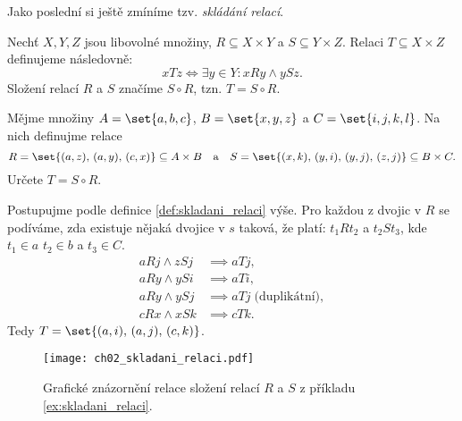 Jako poslední si ještě zmíníme tzv. \emph{skládání relací}.
\begin{definition}\label{def:skladani_relaci}
    Nechť $X,Y,Z$ jsou libovolné množiny, $R\subseteq X\times Y$ a $S\subseteq Y\times Z$. Relaci $T\subseteq X\times Z$ definujeme následovně:
    \begin{equation*}
        xTz \iff \exists y\in Y : xRy \land ySz.
    \end{equation*}
    Složení relací $R$ a $S$ značíme $S\circ R$, tzn. $T=S\circ R$.
\end{definition}
\begin{example}\label{ex:skladani_relaci}
    Mějme množiny $A=\set{a,b,c}$, $B=\set{x,y,z}$ a $C=\set{i,j,k,l}$. Na nich definujme relace
    \begin{equation*}
        R=\set{(a,z),\,(a,y),\,(c,x)}\subseteq A\times B\quad\text{a}\quad S=\set{(x,k),\,(y,i),\,(y,j),\,(z,j)}\subseteq B\times C.
    \end{equation*}
    Určete $T=S\circ R$.
\end{example}
\begin{solution}
    Postupujme podle definice \ref{def:skladani_relaci} výše. Pro každou z dvojic v $R$ se podíváme, zda existuje nějaká dvojice v $s$ taková, že platí: $t_1Rt_2$ a $t_2St_3$, kde $t_1\in a$ $t_2\in b$ a $t_3\in C$.
    \begin{align*}
        aRj \land zSj &\implies aTj,\\
        aRy \land ySi &\implies aTi,\\
        aRy \land ySj &\implies aTj\;\text{(duplikátní)},\\
        cRx \land xSk &\implies cTk.
    \end{align*}
    Tedy $T=\set{(a,i),\,(a,j),\,(c,k)}$.
\end{solution}
\begin{figure}[H]
    \centering
    \texttt{[image: ch02\_skladani\_relaci.pdf]}
    \caption{Grafické znázornění relace složení relací $R$ a $S$ z příkladu \ref{ex:skladani_relaci}.}
    \label{fig:relace_mezi_mnozinami}
\end{figure}

